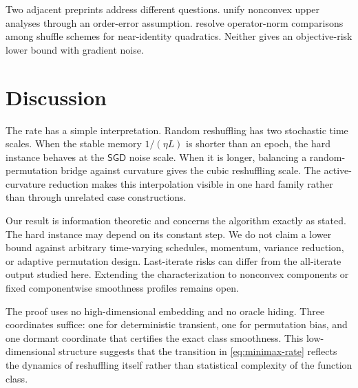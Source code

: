 \documentclass[twoside]{article}
\newcommand{\SGD}{\mathsf{SGD}}
\begin{document}
Two adjacent preprints address different questions. \citet{li2025unified}
unify nonconvex upper analyses through an order-error assumption.
\citet{peng2026resolution} resolve operator-norm comparisons among shuffle
schemes for near-identity quadratics. Neither gives an objective-risk lower
bound with gradient noise.

\section{Discussion}
\label{sec:discussion}

The rate has a simple interpretation. Random reshuffling has two stochastic
time scales. When the stable memory $1/(\eta L)$ is shorter than an epoch, the
hard instance behaves at the $\SGD$ noise scale. When it is longer, balancing a
random-permutation bridge against curvature gives the cubic reshuffling scale.
The active-curvature reduction makes this interpolation visible in one hard
family rather than through unrelated case constructions.

Our result is information theoretic and concerns the algorithm exactly as
stated. The hard instance may depend on its constant step. We do not claim a
lower bound against arbitrary time-varying schedules, momentum, variance
reduction, or adaptive permutation design. Last-iterate risks can differ from
the all-iterate output studied here. Extending the characterization to
nonconvex components or fixed componentwise smoothness profiles remains open.

The proof uses no high-dimensional embedding and no oracle hiding. Three
coordinates suffice: one for deterministic transient, one for permutation
bias, and one dormant coordinate that certifies the exact class smoothness.
This low-dimensional structure suggests that the transition in
\eqref{eq:minimax-rate} reflects the dynamics of reshuffling itself rather
than statistical complexity of the function class.



\clearpage
\end{document}

